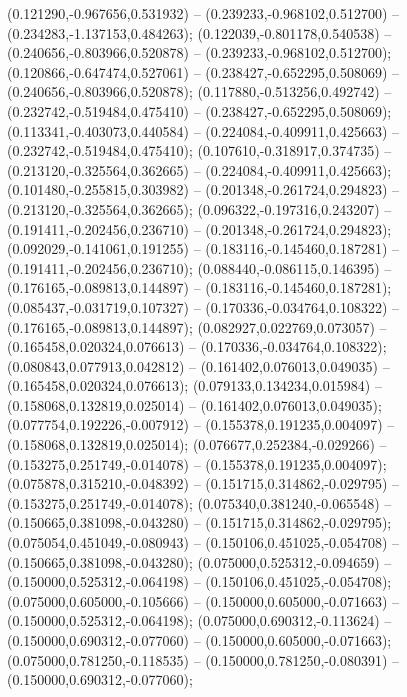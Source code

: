  (0.121290,-0.967656,0.531932) -- (0.239233,-0.968102,0.512700) -- (0.234283,-1.137153,0.484263);
 (0.122039,-0.801178,0.540538) -- (0.240656,-0.803966,0.520878) -- (0.239233,-0.968102,0.512700);
 (0.120866,-0.647474,0.527061) -- (0.238427,-0.652295,0.508069) -- (0.240656,-0.803966,0.520878);
 (0.117880,-0.513256,0.492742) -- (0.232742,-0.519484,0.475410) -- (0.238427,-0.652295,0.508069);
 (0.113341,-0.403073,0.440584) -- (0.224084,-0.409911,0.425663) -- (0.232742,-0.519484,0.475410);
 (0.107610,-0.318917,0.374735) -- (0.213120,-0.325564,0.362665) -- (0.224084,-0.409911,0.425663);
 (0.101480,-0.255815,0.303982) -- (0.201348,-0.261724,0.294823) -- (0.213120,-0.325564,0.362665);
 (0.096322,-0.197316,0.243207) -- (0.191411,-0.202456,0.236710) -- (0.201348,-0.261724,0.294823);
 (0.092029,-0.141061,0.191255) -- (0.183116,-0.145460,0.187281) -- (0.191411,-0.202456,0.236710);
 (0.088440,-0.086115,0.146395) -- (0.176165,-0.089813,0.144897) -- (0.183116,-0.145460,0.187281);
 (0.085437,-0.031719,0.107327) -- (0.170336,-0.034764,0.108322) -- (0.176165,-0.089813,0.144897);
 (0.082927,0.022769,0.073057) -- (0.165458,0.020324,0.076613) -- (0.170336,-0.034764,0.108322);
 (0.080843,0.077913,0.042812) -- (0.161402,0.076013,0.049035) -- (0.165458,0.020324,0.076613);
 (0.079133,0.134234,0.015984) -- (0.158068,0.132819,0.025014) -- (0.161402,0.076013,0.049035);
 (0.077754,0.192226,-0.007912) -- (0.155378,0.191235,0.004097) -- (0.158068,0.132819,0.025014);
 (0.076677,0.252384,-0.029266) -- (0.153275,0.251749,-0.014078) -- (0.155378,0.191235,0.004097);
 (0.075878,0.315210,-0.048392) -- (0.151715,0.314862,-0.029795) -- (0.153275,0.251749,-0.014078);
 (0.075340,0.381240,-0.065548) -- (0.150665,0.381098,-0.043280) -- (0.151715,0.314862,-0.029795);
 (0.075054,0.451049,-0.080943) -- (0.150106,0.451025,-0.054708) -- (0.150665,0.381098,-0.043280);
 (0.075000,0.525312,-0.094659) -- (0.150000,0.525312,-0.064198) -- (0.150106,0.451025,-0.054708);
 (0.075000,0.605000,-0.105666) -- (0.150000,0.605000,-0.071663) -- (0.150000,0.525312,-0.064198);
 (0.075000,0.690312,-0.113624) -- (0.150000,0.690312,-0.077060) -- (0.150000,0.605000,-0.071663);
 (0.075000,0.781250,-0.118535) -- (0.150000,0.781250,-0.080391) -- (0.150000,0.690312,-0.077060);
